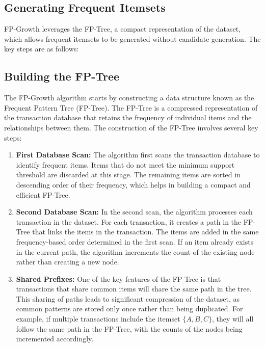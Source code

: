 \documentclass{article}
\begin{document}
\subsection{Generating Frequent Itemsets}
FP-Growth leverages the FP-Tree, a compact representation of the dataset, which allows frequent itemsets to be generated without candidate generation. The key steps are as follows:

\subsection{Building the FP-Tree}
The FP-Growth algorithm starts by constructing a data structure known as the Frequent Pattern Tree (FP-Tree). The FP-Tree is a compressed representation of the transaction database that retains the frequency of individual items and the relationships between them. The construction of the FP-Tree involves several key steps:

\begin{enumerate}
    \item \textbf{First Database Scan:} The algorithm first scans the transaction database to identify frequent items. Items that do not meet the minimum support threshold are discarded at this stage. The remaining items are sorted in descending order of their frequency, which helps in building a compact and efficient FP-Tree.

    \item \textbf{Second Database Scan:} In the second scan, the algorithm processes each transaction in the dataset. For each transaction, it creates a path in the FP-Tree that links the items in the transaction. The items are added in the same frequency-based order determined in the first scan. If an item already exists in the current path, the algorithm increments the count of the existing node rather than creating a new node.

    \item \textbf{Shared Prefixes:} One of the key features of the FP-Tree is that transactions that share common items will share the same path in the tree. This sharing of paths leads to significant compression of the dataset, as common patterns are stored only once rather than being duplicated. For example, if multiple transactions include the itemset $\{A, B, C\}$, they will all follow the same path in the FP-Tree, with the counts of the nodes being incremented accordingly.

\end{enumerate}
\end{document}
